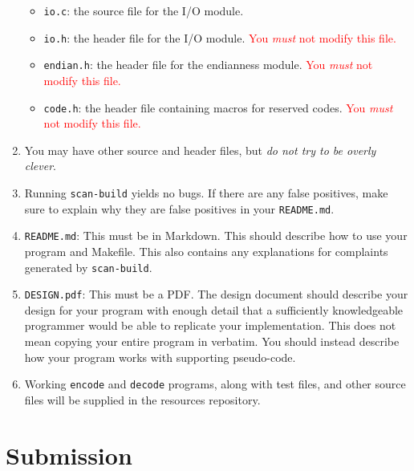 \documentclass{article}
\begin{document}
\begin{enumerate}
\begin{itemize}
            \item \texttt{io.c}: the source file for the I/O module.

            \item \texttt{io.h}: the header file for the I/O module.
                \textcolor{red}{You \emph{must} not modify this file.}

            \item \texttt{endian.h}: the header file for the endianness module.
                \textcolor{red}{You \emph{must} not modify this file.}

            \item \texttt{code.h}: the header file containing macros for
              reserved codes. \textcolor{red}{You \emph{must} not modify
              this file.}
        \end{itemize}

    \item You may have other source and header files, but
        \emph{do not try to be overly clever}.

    \item Running \texttt{scan-build} yields no bugs. If there are any
      false positives, make sure to explain why they are false positives
      in your \texttt{README.md}.

    \item \texttt{README.md}: This must be in Markdown. This should
      describe how to use your program and Makefile. This also contains
      any explanations for complaints generated by \texttt{scan-build}.

    \item \texttt{DESIGN.pdf}: This must be a PDF. The design document should
        describe your design for your program with enough detail that a
        sufficiently knowledgeable programmer would be able to replicate your
        implementation. This does not mean copying your entire program in
        verbatim. You should instead describe how your program works with
        supporting pseudo-code.

    \item Working \texttt{encode} and \texttt{decode} programs, along with test
        files, and other source files will be supplied in the resources repository.
\end{enumerate}


\section{Submission}
\end{document}
